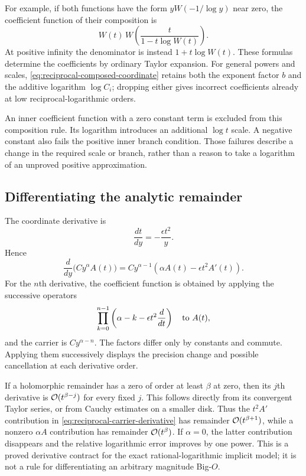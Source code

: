 For example, if both functions have the form $yW(-1/\log y)$ near zero,
the coefficient function of their composition is
\[
 W(t)\,W\!\left(\frac{t}{1-t\log W(t)}\right).
\]
At positive infinity the denominator is instead $1+t\log W(t)$.
These formulas determine the coefficients by ordinary Taylor expansion.
For general powers and scales, \eqref{eq:reciprocal-composed-coordinate}
retains both the exponent factor $b$ and the additive logarithm
$\log C_i$; dropping either gives incorrect coefficients already at low
reciprocal-logarithmic orders.

An inner coefficient function with a zero constant term is excluded from
this composition rule. Its logarithm introduces an additional $\log t$
scale. A negative constant also fails the positive inner branch condition.
Those failures describe a change in the required scale or branch, rather
than a reason to take a logarithm of an unproved positive approximation.

\subsection{Differentiating the analytic remainder}

The coordinate derivative is
\[
 \frac{dt}{dy}=-\frac{\epsilon t^2}{y}.
\]
Hence
\begin{equation}
 \frac{d}{dy}\bigl(Cy^\alpha A(t)\bigr)
 =Cy^{\alpha-1}\left(\alpha A(t)-\epsilon t^2 A'(t)\right).
 \label{eq:reciprocal-carrier-derivative}
\end{equation}
For the $n$th derivative, the coefficient function is obtained by applying
the successive operators
\begin{equation}
 \prod_{k=0}^{n-1}
 \left(\alpha-k-\epsilon t^2\frac{d}{dt}\right)
 \quad\hbox{to }A(t),
 \label{eq:reciprocal-carrier-higher-derivatives}
\end{equation}
and the carrier is $Cy^{\alpha-n}$. The factors differ only by constants
and commute. Applying them successively displays the precision change
and possible cancellation at each derivative order.

If a holomorphic remainder has a zero of order at least $\beta$ at zero,
then its $j$th derivative is $\mathcal O(t^{\beta-j})$ for every fixed $j$.
This follows directly from its convergent Taylor series, or from Cauchy
estimates on a smaller disk. Thus the $t^2 A'$ contribution in
\eqref{eq:reciprocal-carrier-derivative} has remainder
$\mathcal O(t^{\beta+1})$, while a nonzero $\alpha A$ contribution has remainder
$\mathcal O(t^\beta)$. If $\alpha=0$, the latter contribution disappears and the
relative logarithmic error improves by one power. This is a proved
derivative contract for the exact rational-logarithmic implicit model;
it is not a rule for differentiating an arbitrary magnitude Big-$O$.

